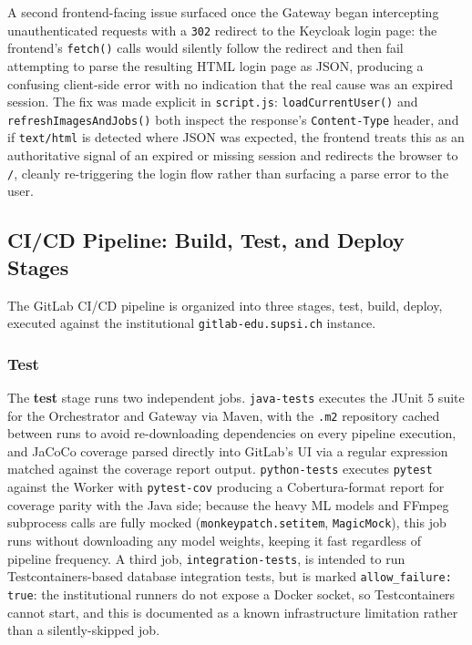 \documentclass[twoside]{supsistudent}
\begin{document}
A second frontend-facing issue surfaced once the Gateway began intercepting unauthenticated requests with a \texttt{302} redirect to the Keycloak login page: the frontend's \texttt{fetch()} calls would silently follow the redirect and then fail attempting to parse the resulting HTML login page as JSON, producing a confusing client-side error with no indication that the real cause was an expired session. The fix was made explicit in \texttt{script.js}: \texttt{loadCurrentUser()} and \texttt{refreshImagesAndJobs()} both inspect the response's \texttt{Content-Type} header, and if \texttt{text/html} is detected where JSON was expected, the frontend treats this as an authoritative signal of an expired or missing session and redirects the browser to \texttt{/}, cleanly re-triggering the login flow rather than surfacing a parse error to the user.

\subsection{CI/CD Pipeline: Build, Test, and Deploy Stages}
The GitLab CI/CD pipeline is organized into three stages, test, build, deploy, executed against the institutional \texttt{gitlab-edu.supsi.ch} instance.

\subsubsection{Test}
The \textbf{test} stage runs two independent jobs. \texttt{java-tests} executes the JUnit 5 suite for the Orchestrator and Gateway via Maven, with the \texttt{.m2} repository cached between runs to avoid re-downloading dependencies on every pipeline execution, and JaCoCo coverage parsed directly into GitLab's UI via a regular expression matched against the coverage report output. \texttt{python-tests} executes \texttt{pytest} against the Worker with \texttt{pytest-cov} producing a Cobertura-format report for coverage parity with the Java side; because the heavy ML models and FFmpeg subprocess calls are fully mocked (\texttt{monkeypatch.setitem}, \texttt{MagicMock}), this job runs without downloading any model weights, keeping it fast regardless of pipeline frequency. A third job, \texttt{integration-tests}, is intended to run Testcontainers-based database integration tests, but is marked \texttt{allow\_failure: true}: the institutional runners do not expose a Docker socket, so Testcontainers cannot start, and this is documented as a known infrastructure limitation rather than a silently-skipped job.
\end{document}
